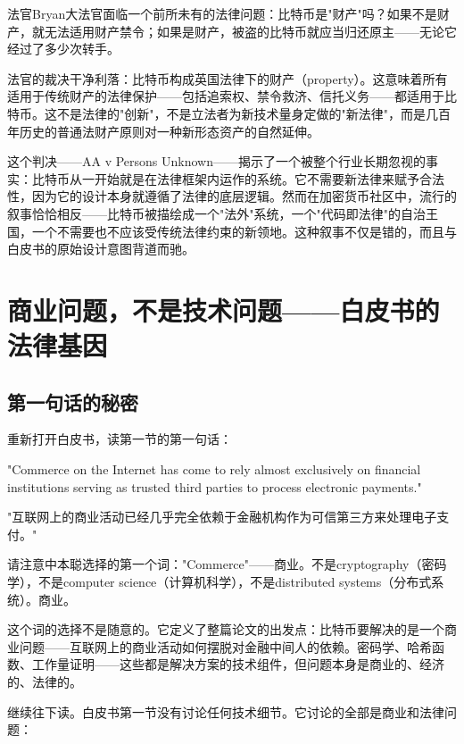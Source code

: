 \documentclass[a4paper,12pt,openany]{ctexbook}
\newenvironment{quoting}{%
  \par\vspace{0.5em}%
  \begin{list}{}{%
    \setlength{\leftmargin}{2em}%
    \setlength{\rightmargin}{2em}%
    \setlength{\parsep}{0.3em}%
    \setlength{\itemsep}{0pt}%
    \setlength{\topsep}{0pt}%
  }%
  \item\relax
}{%
  \end{list}%
  \par\vspace{0.5em}%
}
\begin{document}
法官Bryan大法官面临一个前所未有的法律问题：比特币是"财产"吗？如果不是财产，就无法适用财产禁令；如果是财产，被盗的比特币就应当归还原主——无论它经过了多少次转手。

法官的裁决干净利落：比特币构成英国法律下的财产（property）。这意味着所有适用于传统财产的法律保护——包括追索权、禁令救济、信托义务——都适用于比特币。这不是法律的"创新"，不是立法者为新技术量身定做的"新法律"，而是几百年历史的普通法财产原则对一种新形态资产的自然延伸。

这个判决——AA v Persons Unknown——揭示了一个被整个行业长期忽视的事实：比特币从一开始就是在法律框架内运作的系统。它不需要新法律来赋予合法性，因为它的设计本身就遵循了法律的底层逻辑。然而在加密货币社区中，流行的叙事恰恰相反——比特币被描绘成一个"法外"系统，一个"代码即法律"的自治王国，一个不需要也不应该受传统法律约束的新领地。这种叙事不仅是错的，而且与白皮书的原始设计意图背道而驰。


\section*{商业问题，不是技术问题——白皮书的法律基因}



\subsection*{第一句话的秘密}


重新打开白皮书，读第一节的第一句话：


\begin{quoting}
\small
"Commerce on the Internet has come to rely almost exclusively on financial institutions serving as trusted third parties to process electronic payments."

"互联网上的商业活动已经几乎完全依赖于金融机构作为可信第三方来处理电子支付。"
\end{quoting}


请注意中本聪选择的第一个词："Commerce"——商业。不是cryptography（密码学），不是computer science（计算机科学），不是distributed systems（分布式系统）。商业。

这个词的选择不是随意的。它定义了整篇论文的出发点：比特币要解决的是一个商业问题——互联网上的商业活动如何摆脱对金融中间人的依赖。密码学、哈希函数、工作量证明——这些都是解决方案的技术组件，但问题本身是商业的、经济的、法律的。

继续往下读。白皮书第一节没有讨论任何技术细节。它讨论的全部是商业和法律问题：
\end{document}

